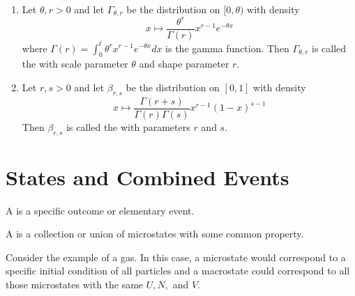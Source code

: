\documentclass[12pt, a4paper, oneside, openright, titlepage]{book}
\begin{document}
\begin{eg}
    \leavevmode
    \begin{enumerate}[label=\roman*]
        \item Let $\theta, r > 0$ and let $\Gamma_{\theta,r}$ be the distribution on $[0,\theta)$ with density \begin{equation*}
                x\mapsto \frac{\theta^r}{\Gamma(r)}x^{r-1}e^{-\theta x}
        \end{equation*}
            where $\Gamma(r) = \int_0^{t}\theta^rx^{r-1}e^{-\theta x}dx$ is the gamma function. Then $\Gamma_{\theta,r}$ is called the  with scale parameter $\theta$ and shape parameter $r$.
        \item Let $r,s > 0$ and let $\beta_{r,s}$ be the distribution on $[0,1]$ with density \begin{equation*}
                x\mapsto \frac{\Gamma(r+s)}{\Gamma(r)\Gamma(s)}x^{r-1}(1-x)^{s-1}
        \end{equation*}
            Then $\beta_{r,s}$ is called the  with parameters $r$ and $s$.
    \end{enumerate}
\end{eg}


\section{States and Combined Events}

\begin{defn}
    A  is a specific outcome or elementary event.
\end{defn}

\begin{defn}
    A  is a collection or union of microstates with some common property.
\end{defn}

Consider the example of a gas. In this case, a microstate would correspond to a specific initial condition of all particles and a macrostate could correspond to all those microstates with the same $U,N,$ and $V$. 
\end{document}

